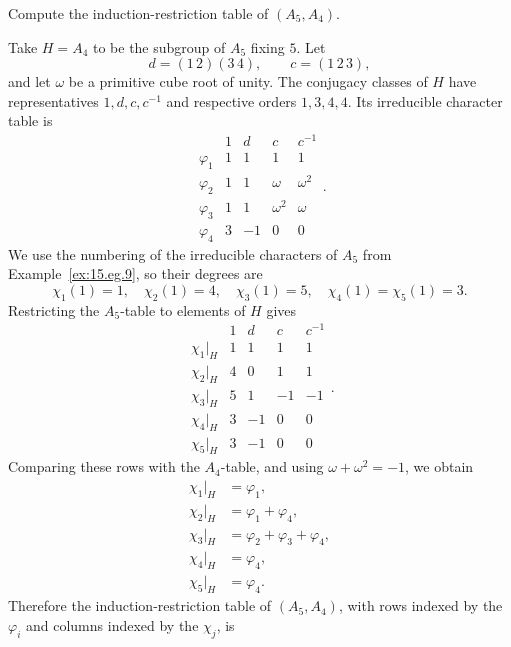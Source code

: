 \documentclass[../Odyssey_Project.tex]{subfiles}
\begin{document}
\begin{exercise}
\label{ex:16.5}
Compute the induction-restriction table of $(A_5, A_4)$.
\end{exercise}
\begin{solution}
    Take $H=A_4$ to be the subgroup of $A_5$ fixing $5$. Let
    \[
        d=(1\,2)(3\,4),
        \qquad
        c=(1\,2\,3),
    \]
    and let $\omega$ be a primitive cube root of unity. The conjugacy classes of $H$ have representatives $1,d,c,c^{-1}$ and respective orders $1,3,4,4$. Its irreducible character table is
    \[
        \begin{array}{c|rrrr}
            &1&d&c&c^{-1}\\
            \hline
            \varphi_1&1&1&1&1\\
            \varphi_2&1&1&\omega&\omega^2\\
            \varphi_3&1&1&\omega^2&\omega\\
            \varphi_4&3&-1&0&0
        \end{array}.
    \]
    We use the numbering of the irreducible characters of $A_5$ from Example~\ref{ex:15.eg.9}, so their degrees are
    \[
        \chi_1(1)=1,
        \quad
        \chi_2(1)=4,
        \quad
        \chi_3(1)=5,
        \quad
        \chi_4(1)=\chi_5(1)=3.
    \]
    Restricting the $A_5$-table to elements of $H$ gives
    \[
        \begin{array}{c|rrrr}
            &1&d&c&c^{-1}\\
            \hline
            \chi_1|_H&1&1&1&1\\
            \chi_2|_H&4&0&1&1\\
            \chi_3|_H&5&1&-1&-1\\
            \chi_4|_H&3&-1&0&0\\
            \chi_5|_H&3&-1&0&0
        \end{array}.
    \]
    Comparing these rows with the $A_4$-table, and using $\omega+\omega^2=-1$, we obtain
    \[
        \begin{aligned}
            \chi_1|_H&=\varphi_1,\\
            \chi_2|_H&=\varphi_1+\varphi_4,\\
            \chi_3|_H&=\varphi_2+\varphi_3+\varphi_4,\\
            \chi_4|_H&=\varphi_4,\\
            \chi_5|_H&=\varphi_4.
        \end{aligned}
    \]
    Therefore the induction-restriction table of $(A_5,A_4)$, with rows indexed by the $\varphi_i$ and columns indexed by the $\chi_j$, is

\end{solution}
\end{document}
